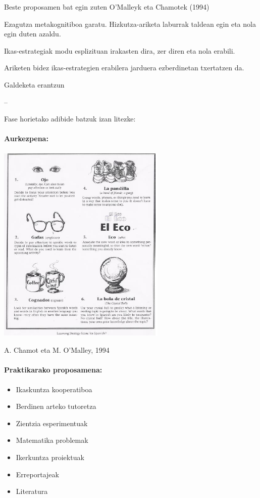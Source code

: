 \documentclass[]{book}
\providecommand{\tightlist}{%
  \setlength{\itemsep}{0pt}\setlength{\parskip}{0pt}}
\let\oldparagraph\paragraph
\renewcommand{\paragraph}[1]{\oldparagraph{#1}\mbox{}}
\begin{document}
Beste proposamen bat egin zuten O'Malleyk eta Chamotek (1994)

\begin{description}
\tightlist
\item[Prestakuntza fasea]
Ezagutza metakognitiboa garatu.
Hizkutza-ariketa laburrak taldean egin eta nola egin duten azaldu.
\item[Aurkezpena]
Ikas-estrategiak modu esplizituan irakasten dira, zer diren eta nola erabili.
\item[Praktika]
Ariketen bidez ikas-estrategien erabilera jarduera ezberdinetan txertatzen da.
\item[Ebaluazioa]
Galdeketa erantzun
\end{description}

--

Fase horietako adibide batzuk izan litezke:

\hypertarget{aurkezpena}{%
\paragraph{Aurkezpena:}\label{aurkezpena}}

\includegraphics{assets/06-04.png}

A. Chamot eta M. O'Malley, 1994

\hypertarget{praktikarako-proposamena}{%
\paragraph{Praktikarako proposamena:}\label{praktikarako-proposamena}}

\begin{itemize}
\tightlist
\item
  Ikaskuntza kooperatiboa
\item
  Berdinen arteko tutoretza
\item
  Zientzia esperimentuak
\item
  Matematika problemak
\item
  Ikerkuntza proiektuak
\item
  Erreportajeak
\item
  Literatura
\end{itemize}
\end{document}
